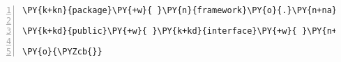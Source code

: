 \begin{Verbatim}[commandchars=\\\{\},numbers=left,firstnumber=1,stepnumber=1,frame=single,fontsize=\small]
\PY{k+kn}{package}\PY{+w}{ }\PY{n}{framework}\PY{o}{.}\PY{n+na}{process}\PY{o}{;}

\PY{k+kd}{public}\PY{+w}{ }\PY{k+kd}{interface}\PY{+w}{ }\PY{n+nc}{Output}\PY{+w}{ }\PY{o}{\PYZob{}}

\PY{o}{\PYZcb{}}
\end{Verbatim}
